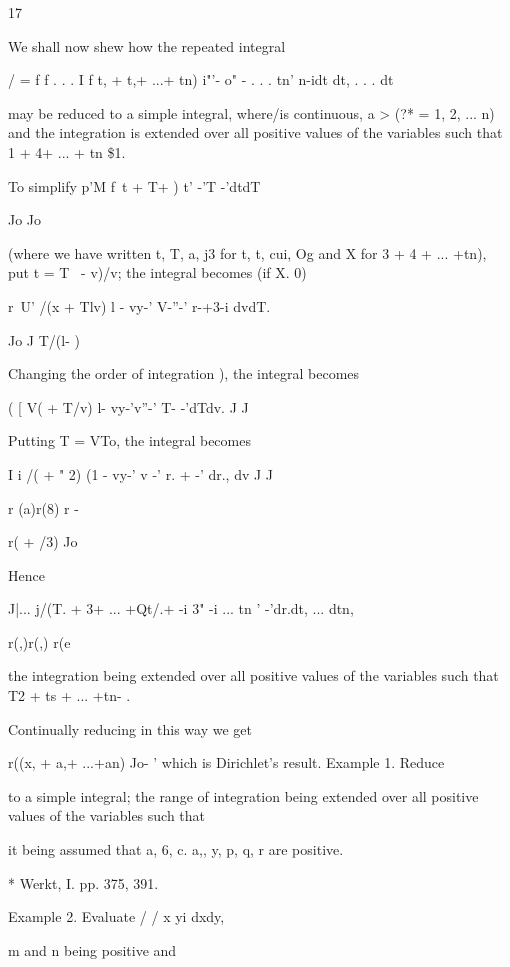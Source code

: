 17

%
%


We shall now shew how the repeated integral

/ = f f . . . I f t, + t,+ ...+ tn) i"'- o" - . . . tn' n-idt dt, . .
. dt

may be reduced to a simple integral, where/is continuous, a > (?* = 1,
2, ... n) and the integration is extended over all positive values of
the variables such that 1 + 4+ ... + tn \$1.

To simplify p'M f\ t + T+ ) t' -'T -'dtdT

Jo Jo

(where we have written t, T, a, j3 for t, t, cui, Og and X for 3 + 4
+ ... +tn), put t = T \ - v)/v; the integral becomes (if X. 0)

r~U' /(x + Tlv) l - vy-' V-''-' r-+3-i dvdT.

Jo J T/(l- )

Changing the order of integration ), the integral becomes

( [ V( + T/v) l- vy-'v''-' T- -'dTdv. J J

Putting T = VTo, the integral becomes

I i /( + " 2) (1 - vy-' v -' r. + -' dr., dv J J

r (a)r(8) r -

r( + /3) Jo

Hence

  J|... j/(T. + 3+ ... +Qt/.+ -i 3" -i ... tn ' -'dr.dt, ... dtn,

r(,)r(,) r(e

the integration being extended over all positive values of the
variables such that T2 + ts + ... +tn- .

Continually reducing in this way we get

r((x, + a,+ ...+an) Jo- ' which is Dirichlet's result. Example 1.
Reduce

to a simple integral; the range of integration being extended over
all positive values of the variables such that

it being assumed that a, 6, c. a,, y, p, q, r are positive.

* Werkt, I. pp. 375, 391.

%
%

Example 2. Evaluate / / x yi dxdy,

m and n being positive and

